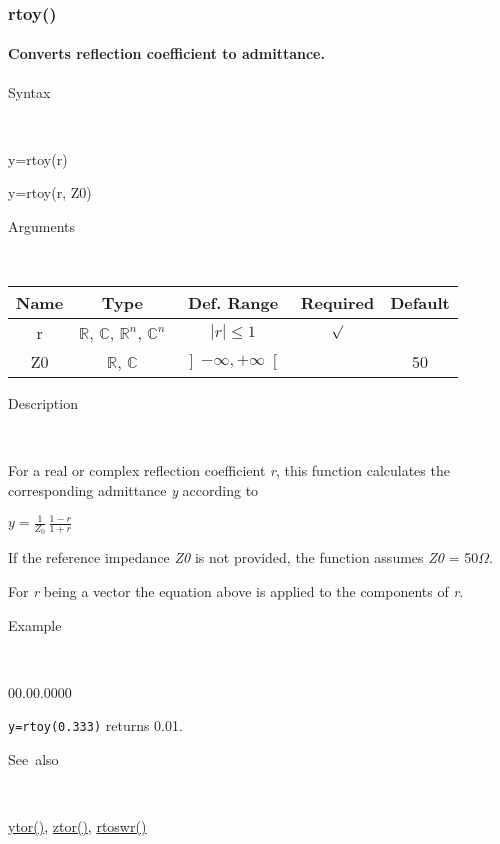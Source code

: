 \newpage
\subsubsection*{\hypertarget{rtoy}{}{\Large rtoy()}}


\paragraph{\label{par:rtoy}Converts reflection coefficient to admittance.}

\begin{description}
\item [Syntax]~
\end{description}
y=rtoy(r)

\noindent y=rtoy(r, Z0)

\begin{description}
\item [Arguments]~
\end{description}
\begin{tabular}{|c|c|c|c|c|}
\hline 
Name&
Type&
Def. Range&
Required&
Default\tabularnewline
\hline
\hline 
r&
$\mathbb{R}$, $\mathbb{C}$, $\mathbb{R}^{n}$, $\mathbb{C}^{n}$&
$\left|r\right|\leq1$&
$\surd$&
\tabularnewline
\hline
Z0&
$\mathbb{R}$, $\mathbb{C}$&
$\left]-\infty,+\infty\right[$&
&
50\tabularnewline
\hline
\end{tabular}

\begin{description}
\item [Description]~
\end{description}
For a real or complex reflection coefficient \textit{r}, this function
calculates the corresponding admittance \textit{y} according to 

\medskip{}
$y={\displaystyle \frac{1}{Z_{0}}\,\frac{1-r}{1+r}}$
\medskip{}

\noindent If the reference impedance \textit{Z0} is not provided,
the function assumes \textit{Z0} = 50$\Omega$.

\noindent For \textit{r} being a vector the equation above is applied
to the components of \textit{r}.

\begin{description}
\item [Example]~
\end{description}
\begin{lyxlist}{00.00.0000}
\item [\texttt{y=rtoy(0.333)}]returns 0.01.
\end{lyxlist}
\begin{description}
\item [See~also]~
\end{description}
\textcolor{blue}{\hyperlink{ytor}{ytor()}}\textcolor{black}{,} \textcolor{blue}{\hyperlink{ztor}{ztor()}}\textcolor{black}{,}
\textcolor{blue}{\hyperlink{rtoswr}{rtoswr()}}


